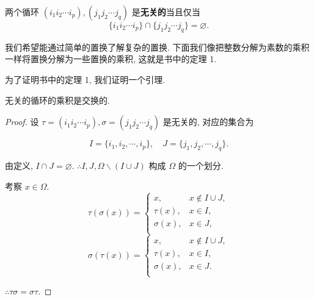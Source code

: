\documentclass{ctexart}
\begin{document}
\begin{definition}
    两个循环 $(i_1i_2\cdots i_p),(j_1j_2\cdots j_q)$ 是\textbf{无关的}当且仅当
    \[\{i_1i_2\cdots i_p\}\cap\{j_1j_2\cdots j_q\}=\varnothing.\]
\end{definition}

我们希望能通过简单的置换了解复杂的置换. 下面我们像把整数分解为素数的乘积一样将置换分解为一些置换的乘积, 这就是书中的定理 1.

为了证明书中的定理 1, 我们证明一个引理.
\begin{lemma}\label{l1.2}
    无关的循环的乘积是交换的.
\end{lemma}
\begin{proof}
    设 $\tau=(i_1i_2\cdots i_p),\sigma=(j_1j_2\cdots j_q)$ 是无关的, 对应的集合为
    
    \[I=\{i_1,i_2,\cdots,i_p\},\quad J=\{j_1,j_2,\cdots,j_q\}.\]

    由定义, $I\cap J=\varnothing$. $\therefore I,J,\Omega\backslash(I\cup J)$ 构成 $\Omega$ 的一个划分.

    考察 $x\in\Omega$.
    \[\tau(\sigma(x))=\begin{cases}
        x, & x\notin I\cup J, \\
        \tau(x), & x\in I, \\
        \sigma(x), & x\in J, \\
    \end{cases}\]
    \[\sigma(\tau(x))=\begin{cases}
        x, & x\notin I\cup J, \\
        \tau(x), & x\in I, \\
        \sigma(x), & x\in J. \\
    \end{cases}\]
    
    $\therefore\tau\sigma=\sigma\tau$.
\end{proof}
\end{document}
